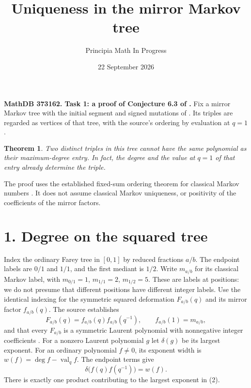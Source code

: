 \documentclass[11pt]{article}
\title{Uniqueness in the mirror Markov tree}
\author{Principia Math In Progress}
\date{22 September 2026}
\newtheorem{theorem}{Theorem}
\begin{document}
\maketitle
\noindent\textbf{MathDB 373162. Task 1: a proof of Conjecture 6.3 of \cite{mirror}.}
Fix a mirror Markov tree with the initial segment and signed mutations of
\cite[Definitions 4.1--4.2]{mirror}. Its triples are regarded as vertices of
that tree, with the source's ordering by evaluation at $q=1$.
\begin{theorem}\label{main}
Two distinct triples in this tree cannot have the same polynomial as their
maximum-degree entry. In fact, the degree and the value at $q=1$ of that
entry already determine the triple.
\end{theorem}
The proof uses the established fixed-sum ordering theorem for classical
Markov numbers \cite{fixedsum}. It does not assume classical Markov
uniqueness, or positivity of the coefficients of the mirror factors.

\section*{1. Degree on the squared tree}
Index the ordinary Farey tree in $[0,1]$ by reduced fractions $a/b$.
The endpoint labels are $0/1$ and $1/1$, and the first mediant is $1/2$.
Write $m_{a/b}$ for its classical Markov label, with
$m_{0/1}=1$, $m_{1/1}=2$, $m_{1/2}=5$. These are labels at positions:
we do not presume that different positions have different integer labels.
Use the identical indexing for the symmetric squared deformation
$F_{a/b}(q)$ and its mirror factor $f_{a/b}(q)$.
The source establishes
\[
 F_{a/b}(q)=f_{a/b}(q)f_{a/b}(q^{-1}),\qquad
 f_{a/b}(1)=m_{a/b},                                      \tag{1}
\]
and that every $F_{a/b}$ is a symmetric Laurent polynomial with
nonnegative integer coefficients \cite[Theorem 2.2, Section 3.1,
Theorem 4.4 and Notation 4.5]{mirror}.
For a nonzero Laurent polynomial $g$ let $\delta(g)$ be its largest
exponent. For an ordinary polynomial $f\ne0$, its exponent width is
$w(f)=\deg f-\operatorname{val}_q f$. The endpoint terms give
\[
 \delta\bigl(f(q)f(q^{-1})\bigr)=w(f).                    \tag{2}
\]
There is exactly one product contributing to the largest exponent in (2).
\end{document}
